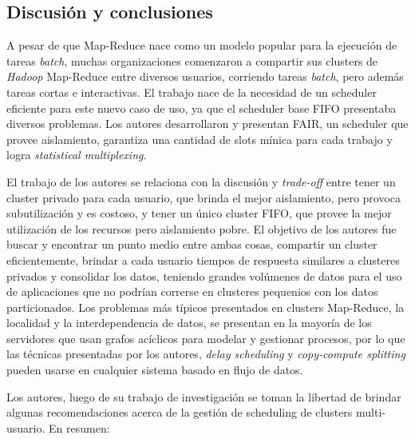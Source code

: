 \subsection{Discusi\'on y conclusiones}

A pesar de que Map-Reduce nace como un modelo popular para la ejecuci\'on de tareas \emph{batch}, muchas organizaciones comenzaron a compartir sus clusters de \emph{Hadoop} Map-Reduce entre diversos usuarios, corriendo tareas \emph{batch}, pero adem\'as tareas cortas e interactivas. El trabajo nace de la necesidad de un scheduler eficiente para este nuevo caso de uso, ya que el scheduler base FIFO presentaba diversos problemas. Los autores desarrollaron y presentan FAIR, un scheduler que provee aislamiento, garantiza una cantidad de slots m\'inica para cada trabajo y logra \emph{statistical multiplexing}.

\vspace{2mm}

El trabajo de los autores se relaciona con la discusi\'on y \emph{trade-off} entre tener un cluster privado para cada usuario, que brinda el mejor aislamiento, pero provoca subutilizaci\'on y es costoso, y tener un \'unico cluster FIFO, que provee la mejor utilizaci\'on de los recursos pero aislamiento pobre. El objetivo de los autores fue buscar y encontrar un punto medio entre ambas cosas, compartir un cluster eficientemente, brindar a cada usuario tiempos de respuesta similares a clusteres privados y consolidar los datos, teniendo grandes vol\'umenes de datos para el uso de aplicaciones que no podr\'ian correrse en clusteres pequenios con los datos particionados. Los problemas m\'as t\'ipicos presentados en clusters Map-Reduce, la localidad y la interdependencia de datos, se presentan en la mayor\'ia de los servidores que usan grafos ac\'iclicos para modelar y gestionar procesos, por lo que las t\'ecnicas presentadas por los autores, \emph{delay scheduling} y \emph{copy-compute splitting} pueden usarse en cualquier sistema basado en flujo de datos.

\vspace{2mm}

Los autores, luego de su trabajo de investigaci\'on se toman la libertad de brindar algunas recomendaciones acerca de la gesti\'on de scheduling de clusters multi-usuario. En resumen:

